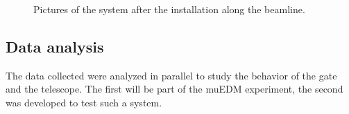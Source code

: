 \begin{refsection}
        \begin{figure}   
            \centering
            \hfill
            \caption[muEDM:2022 installation]{Pictures of the system after the installation along the beamline.}
            \label{fig:muEDM:bt2022:blobs}
        \end{figure}
        
    \subsection{Data analysis}
        The data collected were analyzed in parallel to study the behavior of the gate and the telescope. 
        The first will be part of the muEDM experiment, the second was developed to test such a system.


\end{refsection}
